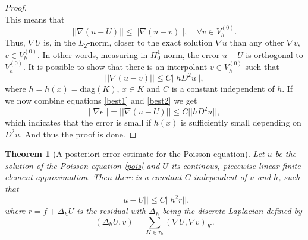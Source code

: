 \documentclass[12pt, a4paper]{article}
\newtheorem{theorem}{Theorem}[section]
\numberwithin{equation}{section}
\begin{document}
\begin{proof}
\begin{equation*}
\end{equation*}
This means that 
\begin{equation}
\label{best1}
||\nabla (u-U)|| \leq ||\nabla (u-v)||, \quad \forall v \in V_h^{(0)}.
\end{equation}
Thus, $\nabla U$ is, in the $L_2$-norm, closer to the exact solution $\nabla u$ than any other $\nabla v$, $v\in V_h^{(0)}$. In other words, measuring in $H_0^1$-norm, the error $u-U$ is orthogonal to $V_h^{(0)}$. It is possible to show that there is an interpolant $v\in V_h^{(0)}$ such that
\begin{equation}
\label{best2}
||\nabla (u-v) ||\leq C||hD^2u||,
\end{equation}
where $h=h(x)=$diag$(K)$, $x\in K$ and $C$ is a constant independent of $h$. If we now combine equations \eqref{best1} and \eqref{best2} we get
\begin{equation*}
||\nabla e|| = ||\nabla (u-U)|| \leq C||hD^2u||,
\end{equation*}
which indicates that the error is small if $h(x)$ is sufficiently small depending on $D^2u$. And thus the proof is done.
\end{proof}

\begin{theorem}[A posteriori error estimate for the Poisson equation]
Let $u$ be the solution of the Poisson equation \eqref{pois} and $U$ its continous, piecewise linear finite element approximation. Then there is a constant $C$ independent of $u$ and $h$, such that
\begin{equation*}
||u-U||\leq C||h^2 r||,
\end{equation*}
where $r=f+\Delta_h U$ is the residual with $\Delta_h$ being the discrete Laplacian defined by
\begin{equation*}
(\Delta_h U, v) = \sum_{K\in \tau_h} (\nabla U, \nabla v)_K.
\end{equation*}
\end{theorem}
\end{document}
